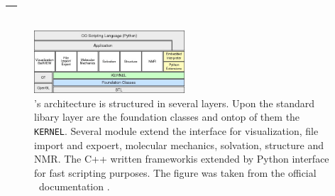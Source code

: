 \section{\ball --  \ballFull}
\label{sec:ball}


\begin{figure}[t]
	\centerline{\includegraphics[width=0.5\textwidth]{gfx/BALL-architecture.jpeg}}
	\caption{\ball's architecture is structured in several layers. Upon the standard libary layer are the foundation classes and ontop of them the \texttt{KERNEL}. Several module extend the interface for visualization, file import and expoert, molecular mechanics, solvation, structure and NMR. The C++ written frameworkis extended by Python interface for fast scripting purposes. The figure was taken from the official \ball\ documentation \cite{BALLTutorial}.}
	\label{fig:ball_architecture}
\end{figure}


